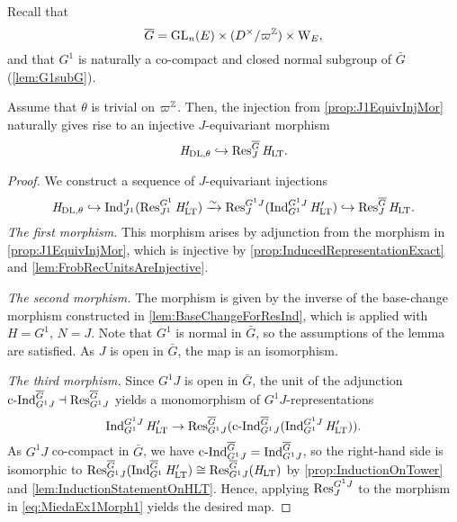 \documentclass[../main.tex]{subfiles}
\begin{document}
Recall that 
\begin{equation*}
  \overline G = \operatorname{GL}_n(E) \times (D^\times/\varpi^{\mathbb{Z}}) \times \mathrm W_E,
\end{equation*}
and that $G^1$ is naturally a co-compact and closed normal subgroup of $\bar G$
(\cref{lem:G1subG}). 

\begin{lem} \label{lem:JEquivInjMor}
  Assume that $\theta$ is trivial on $\varpi^{\mathbb{Z}}$. Then, the injection from
  \cref{prop:J1EquivInjMor} naturally gives rise to an injective
  $J$-equivariant morphism
  \begin{equation*}
    \mathit H_{\mathrm{DL},\theta} \hookrightarrow \operatorname{Res}_J^{\overline G} \mathit H_{\mathrm{LT}}.
  \end{equation*}
\begin{proof} %
  We construct a sequence of $J$-equivariant injections
  \begin{equation*}
    \mathit H_{\mathrm{DL},\theta} \hookrightarrow \operatorname{Ind}_{J^1}^J (\operatorname{Res}_{J^1}^{G^1} \mathit H'_{\mathrm{LT}}) \\ \xrightarrow{\sim} \operatorname{Res}_J^{G^1J}( \operatorname{Ind}_{G^1}^{G^1J} \mathit H'_{\mathrm{LT}}) \hookrightarrow \operatorname{Res}_J^{\overline G}
    \mathit H_{\mathrm{LT}}.
  \end{equation*}
  \textit{The first morphism.}
  This morphism arises by adjunction from the morphism in 
  \cref{prop:J1EquivInjMor}, which is injective by 
  \cref{prop:InducedRepresentationExact} and \cref{lem:FrobRecUnitsAreInjective}.
  
  \textit{The second morphism.} 
  The morphism is given by the inverse of the base-change morphism constructed in
  \cref{lem:BaseChangeForResInd}, which is applied with $H = G^1$, $N = J$. 
  Note that $G^1$ is normal in ${\bar G}$, so the assumptions of the lemma are
  satisfied. As $J$ is open in ${\bar G}$, the map is an isomorphism. 
  
  \textit{The third morphism.}
  Since $G^1J$ is open in ${\bar G}$, the unit of the adjunction $\operatorname{c\text{-}Ind}_{G^1J}^{\overline G} \dashv
  \operatorname{Res}_{G^1J}^{\overline G}$ yields a monomorphism of $G^1J$-representations 
  \begin{equation}\label{eq:MiedaEx1Morph1}
    \operatorname{Ind}_{G^1}^{G^1J} \mathit H_{\mathrm{LT}}' \to \operatorname{Res}_{G^1J}^{\overline G}
    (\operatorname{c\text{-}Ind}_{G^1J}^{\overline G}(\operatorname{Ind}_{G^1}^{G^1J} \mathit H'_{\mathrm{LT}})).
  \end{equation}
  As $G^1J$ co-compact in ${\bar G}$, we have $\operatorname{c\text{-}Ind}_{G^1J}^{\overline G} =
  \operatorname{Ind}_{G^1J}^{\overline G}$, so the right-hand
  side is isomorphic to $\operatorname{Res}_{G^1J}^{\overline G}(\operatorname{Ind}_{G^1}^{\overline G} \mathit H'_{\mathrm{LT}}) \cong
  \operatorname{Res}_{G^1J}^{\overline G}(\mathit H_{\mathrm{LT}})$ by \cref{prop:InductionOnTower} and 
  \cref{lem:InductionStatementOnHLT}. Hence, applying $\operatorname{Res}_J^{G^1J}$ to the
  morphism in \eqref{eq:MiedaEx1Morph1} yields the desired map.
\end{proof} %
\end{lem}
\end{document}
